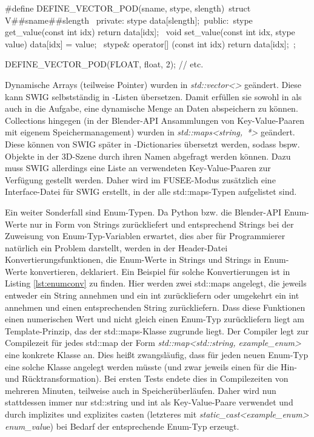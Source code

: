 \begin{code}[caption={Deklaration der Vektordatentypen mittels \protect\#define},label={lst:vfloat}]
#define DEFINE_VECTOR_POD(sname, stype, slength)\
	struct V##sname##slength {\
	private:
		stype data[slength];\
	public:\
		stype get_value(const int idx) { return data[idx]; }\
		void set_value(const int idx, stype value) { data[idx] = value; }\
		stype& operator[] (const int idx) {return data[idx];}\
	};

DEFINE_VECTOR_POD(FLOAT, float, 2);  // etc.
\end{code}

Dynamische Arrays (teilweise Pointer) wurden in \emph{std::vector<>} geändert. Diese kann SWIG selbstständig in \CS{}-Listen übersetzen. Damit erfüllen sie sowohl in \CC{} als auch in \CS{} die Aufgabe, eine dynamische Menge an Daten abspeichern zu können. Collections hingegen (in der Blender-API Ansammlungen von Key-Value-Paaren mit eigenem Speichermanagement) wurden in \mbox{\emph{std::maps<string, *>}} geändert. Diese können von SWIG später in \CS{}-Dictionaries übersetzt werden, sodass bspw. Objekte in der 3D-Szene durch ihren Namen abgefragt werden können. Dazu muss SWIG allerdings eine Liste an verwendeten Key-Value-Paaren zur Verfügung gestellt werden. Daher wird im FUSEE-Modus zusätzlich eine Interface-Datei für SWIG erstellt, in der alle std::maps-Typen aufgelistet sind.

Ein weiter Sonderfall sind Enum-Typen. Da Python bzw. die Blender-API Enum-Werte nur in Form von Strings zurückliefert und entsprechend Strings bei der Zuweisung von Enum-Typ-Variablen erwartet, dies aber für Programmierer natürlich ein Problem darstellt, werden in der Header-Datei Konvertierungsfunktionen, die Enum-Werte in Strings und Strings in Enum-Werte konvertieren, deklariert. Ein Beispiel für solche Konvertierungen ist in Listing \ref{lst:enumconv} zu finden. Hier werden zwei std::maps angelegt, die jeweils entweder ein String annehmen und ein int zurückliefern oder umgekehrt ein int annehmen und einen entsprechenden String zurückliefern. Dass diese Funktionen einen numerischen Wert und nicht gleich einen Enum-Typ zurückliefern liegt am Template-Prinzip, das der std::maps-Klasse zugrunde liegt. Der Compiler legt zur Compilezeit für jedes std::map der Form \emph{std::map<std::string, example\_enum>} eine konkrete Klasse an. Dies heißt zwangsläufig, dass für jeden neuen Enum-Typ eine solche Klasse angelegt werden müsste (und zwar jeweils einen für die Hin- und Rücktransformation). Bei ersten Tests endete dies in Compilezeiten von mehreren Minuten, teilweise auch in Speicherüberläufen. Daher wird nun stattdessen immer nur std::string und int als Key-Value-Paare verwendet und durch implizites und explizites casten (letzteres mit \emph{static\_cast<example\_enum> enum\_valu}e) bei Bedarf der entsprechende Enum-Typ erzeugt. 

